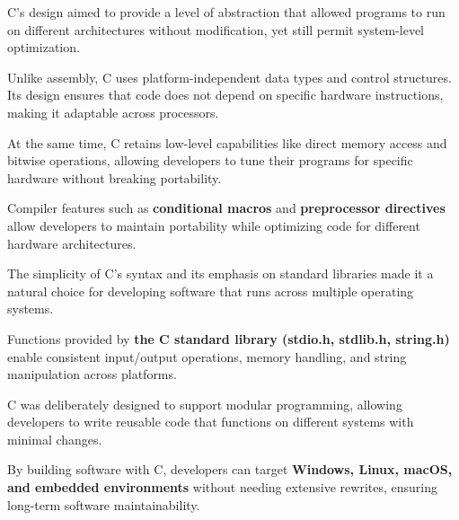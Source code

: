 \begin{NxSSSSBox}
	\begin{NxIDBox}
		C’s design aimed to provide a level of abstraction that allowed programs to run on different architectures without modification, yet still permit system-level optimization.
	\end{NxIDBox}
	\begin{NxIDBox}
		Unlike assembly, C uses platform-independent data types and control structures. Its design ensures that code does not depend on specific hardware instructions, making it adaptable across processors.
	\end{NxIDBox}
	\begin{NxIDBox}
		At the same time, C retains low-level capabilities like direct memory access and bitwise operations, allowing developers to tune their programs for specific hardware without breaking portability.
	\end{NxIDBox}
	\begin{NxIDBox}
		Compiler features such as \textbf{conditional macros} and \textbf{preprocessor directives} allow developers to maintain portability while optimizing code for different hardware architectures.
	\end{NxIDBox}
\end{NxSSSSBox}

\begin{NxSSSSBox}
	\begin{NxIDBox}
		The simplicity of C’s syntax and its emphasis on standard libraries made it a natural choice for developing software that runs across multiple operating systems.
	\end{NxIDBox}
	\begin{NxIDBox}
		Functions provided by \textbf{the C standard library (stdio.h, stdlib.h, string.h)} enable consistent input/output operations, memory handling, and string manipulation across platforms.
	\end{NxIDBox}
	\begin{NxIDBox}
		C was deliberately designed to support modular programming, allowing developers to write reusable code that functions on different systems with minimal changes.
	\end{NxIDBox}
	\begin{NxIDBox}
		By building software with C, developers can target \textbf{Windows, Linux, macOS, and embedded environments} without needing extensive rewrites, ensuring long-term software maintainability.
	\end{NxIDBox}
\end{NxSSSSBox}

